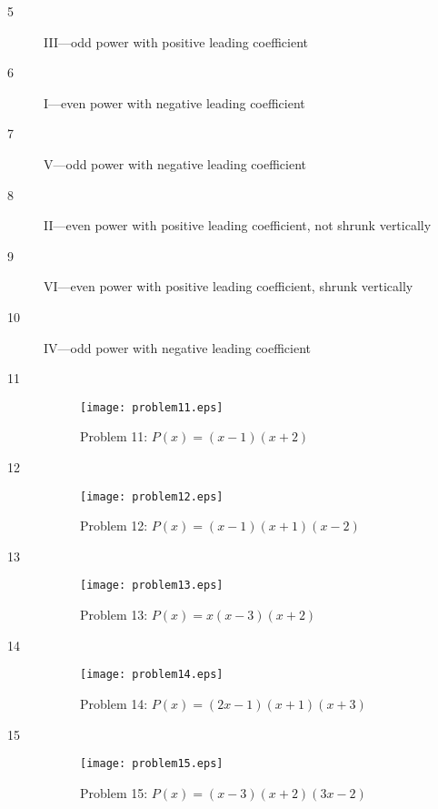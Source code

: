 \documentclass{exam}
\begin{document}
  \begin{description}

    \item[5] III---odd power with positive leading coefficient

    \item[6] I---even power with negative leading coefficient

    \item[7] V---odd power with negative leading coefficient
      
    \item[8] II---even power with positive leading coefficient, not shrunk vertically
      
    \item[9] VI---even power with positive leading coefficient, shrunk vertically

    \item[10] IV---odd power with negative leading coefficient

    \item[11]
      \begin{figure}[H]
        \centering
        \texttt{[image: problem11.eps]}
        \caption*{Problem 11: $P(x) = (x - 1)(x + 2)$}
      \end{figure}

    \item[12]
      \begin{figure}[H]
        \centering
        \texttt{[image: problem12.eps]}
        \caption*{Problem 12: $P(x) = (x - 1)(x + 1)(x - 2)$}
      \end{figure}

    \item[13]
      \begin{figure}[H]
        \centering
        \texttt{[image: problem13.eps]}
        \caption*{Problem 13: $P(x) = x(x - 3)(x + 2)$}
      \end{figure}

    \item[14]
      \begin{figure}[H]
        \centering
        \texttt{[image: problem14.eps]}
        \caption*{Problem 14: $P(x) = (2x - 1)(x + 1)(x + 3)$}
      \end{figure}

    \item[15]
      \begin{figure}[H]
        \centering
        \texttt{[image: problem15.eps]}
        \caption*{Problem 15: $P(x) = (x - 3)(x + 2)(3x - 2)$}
      \end{figure}


\end{description}
\end{document}
